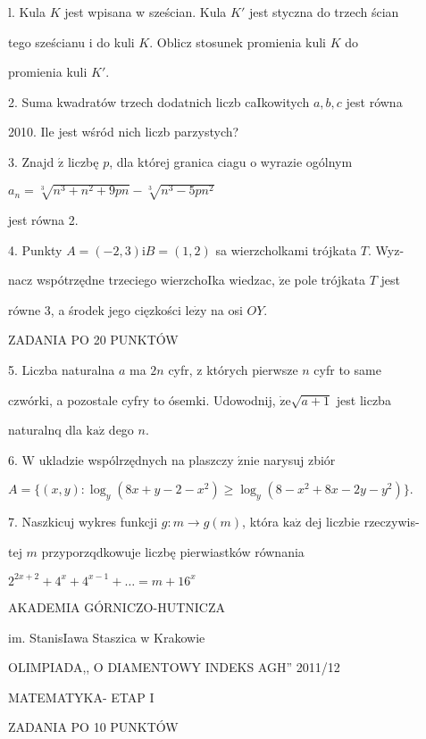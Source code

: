 \documentclass[a4paper,12pt]{article}
\begin{document}
l. Kula $K$ jest wpisana w sześcian. Kula $K'$ jest styczna do trzech ścian

tego sześcianu i do kuli $K$. Oblicz stosunek promienia kuli $K$ do

promienia kuli $K'.$

2. Suma kwadratów trzech dodatnich liczb caIkowitych $a, b, c$ jest równa

2010. Ile jest wśród nich liczb parzystych?

3. Znajd $\acute{\mathrm{z}}$ liczbę $p$, dla której granica ciagu o wyrazie ogólnym

$a_{n}=\sqrt[3]{n^{3}+n^{2}+9pn}-\sqrt[3]{n^{3}-5pn^{2}}$

jest równa 2.

4. Punkty $A= (-2,3) \mathrm{i}B= (1,2)$ sa wierzcholkami trójkata $T$. Wyz-

nacz wspótrzędne trzeciego wierzchoIka wiedzac, $\dot{\mathrm{z}}\mathrm{e}$ pole trójkata $T$ jest

równe 3, a środek jego cięzkości $\mathrm{l}\mathrm{e}\dot{\mathrm{z}}\mathrm{y}$ na osi $OY.$

ZADANIA PO 20 PUNKTÓW

5. Liczba naturalna $a$ ma $2n$ cyfr, z których pierwsze $n$ cyfr to same

czwórki, a pozostale cyfry to ósemki. Udowodnij, $\dot{\mathrm{z}}\mathrm{e}\sqrt{a+1}$ jest liczba

naturalnq dla $\mathrm{k}\mathrm{a}\dot{\mathrm{z}}$ dego $n.$

6. $\mathrm{W}$ ukladzie wspólrzędnych na plaszczy $\acute{\mathrm{z}}\mathrm{n}\mathrm{i}\mathrm{e}$ narysuj zbiór

$A=\{(x,y):\log_{y}(8x+y-2-x^{2})\geq\log_{y}(8-x^{2}+8x-2y-y^{2})\}.$

7. Naszkicuj wykres funkcji $g:m\rightarrow g(m)$, która $\mathrm{k}\mathrm{a}\dot{\mathrm{z}}$ dej liczbie rzeczywis-

tej $m$ przyporzqdkowuje liczbę pierwiastków równania

$2^{2x+2}+4^{x}+4^{x-1}+\ldots=m+16^{x}$






AKADEMIA GÓRNICZO-HUTNICZA

im. StanisIawa Staszica w Krakowie

OLIMPIADA,, O DIAMENTOWY INDEKS AGH'' 2011/12

MATEMATYKA- ETAP I

ZADANIA PO 10 PUNKTÓW
\end{document}
